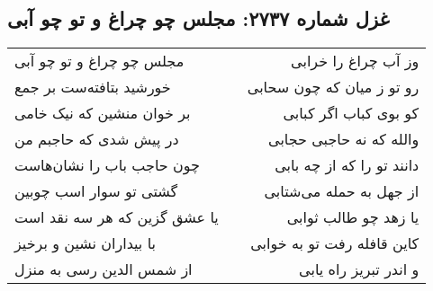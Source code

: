 \begin{center}
\section*{غزل شماره ۲۷۳۷: مجلس چو چراغ و تو چو آبی}
\label{sec:2737}
\begin{longtable}{l p{0.5cm} r}
مجلس چو چراغ و تو چو آبی
&&
وز آب چراغ را خرابی
\\
خورشید بتافته‌ست بر جمع
&&
رو تو ز میان که چون سحابی
\\
بر خوان منشین که نیک خامی
&&
کو بوی کباب اگر کبابی
\\
در پیش شدی که حاجبم من
&&
والله که نه حاجبی حجابی
\\
چون حاجب باب را نشان‌هاست
&&
دانند تو را که از چه بابی
\\
گشتی تو سوار اسب چوبین
&&
از جهل به حمله می‌شتابی
\\
یا عشق گزین که هر سه نقد است
&&
یا زهد چو طالب ثوابی
\\
با بیداران نشین و برخیز
&&
کاین قافله رفت تو به خوابی
\\
از شمس الدین رسی به منزل
&&
و اندر تبریز راه یابی
\\
\end{longtable}
\end{center}

